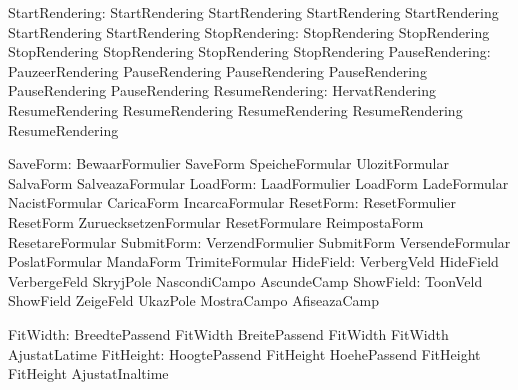 
           StartRendering: StartRendering            StartRendering
                           StartRendering            StartRendering
                           StartRendering            StartRendering
            StopRendering: StopRendering             StopRendering
                           StopRendering             StopRendering
                           StopRendering             StopRendering
           PauseRendering: PauzeerRendering          PauseRendering
                           PauseRendering            PauseRendering
                           PauseRendering            PauseRendering
          ResumeRendering: HervatRendering           ResumeRendering
                           ResumeRendering           ResumeRendering
                           ResumeRendering           ResumeRendering


                 SaveForm: BewaarFormulier           SaveForm
                           SpeicheFormular           UlozitFormular
                           SalvaForm                 SalveazaFormular
                 LoadForm: LaadFormulier             LoadForm
                           LadeFormular              NacistFormular
                           CaricaForm                IncarcaFormular
                ResetForm: ResetFormulier            ResetForm
                           ZuruecksetzenFormular     ResetFormulare
                           ReimpostaForm             ResetareFormular
               SubmitForm: VerzendFormulier          SubmitForm
                           VersendeFormular          PoslatFormular
                           MandaForm                 TrimiteFormular
                HideField: VerbergVeld               HideField
                           VerbergeFeld              SkryjPole
                           NascondiCampo             AscundeCamp
                ShowField: ToonVeld                  ShowField
                           ZeigeFeld                 UkazPole
                           MostraCampo               AfiseazaCamp

                 FitWidth: BreedtePassend            FitWidth
                           BreitePassend             FitWidth
                           FitWidth                  AjustatLatime
                FitHeight: HoogtePassend             FitHeight
                           HoehePassend              FitHeight
                           FitHeight                 AjustatInaltime

